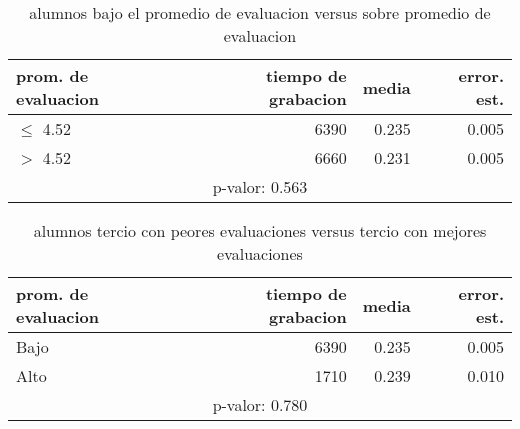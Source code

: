 \documentclass[spanish]{article}
\begin{document}
\begin{table}[h!]
\begin{center}
\begin{tabular}{|l|r|r|r|}
\hline
prom. de evaluacion & tiempo de grabacion & media          & error. est.     \\ \hline
$\leq$ 4.52             &                6390 &          0.235 &            0.005\\ \hline
$>$ 4.52              &                6660 &          0.231 &            0.005\\ \hline
\multicolumn{4}{|c|}{p-valor: 0.563} \\ \hline
\end{tabular}
\caption{alumnos bajo el promedio de evaluacion versus sobre promedio de evaluacion}
\end{center}
\end{table}

\begin{table}[h!]
\begin{center}
\begin{tabular}{|l|r|r|r|}
\hline
prom. de evaluacion & tiempo de grabacion & media          & error. est.     \\ \hline
Bajo                &                6390 &          0.235 &            0.005\\ \hline
Alto                &                1710 &          0.239 &            0.010\\ \hline
\multicolumn{4}{|c|}{p-valor: 0.780} \\ \hline
\end{tabular}
\caption{alumnos tercio con peores evaluaciones versus tercio con mejores evaluaciones}
\end{center}
\end{table}
\end{document}
